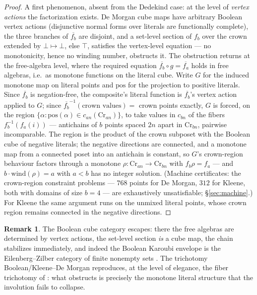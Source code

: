 \documentclass[11pt]{amsart}
\theoremstyle{definition}
\newtheorem{rem}[thm]{Remark}
\newcommand{\Crown}{\mathrm{Cr}}
\begin{document}
\begin{proof}
  A first phenomenon, absent from the Dedekind case: at the level
  of \emph{vertex actions} the factorization exists.  De Morgan
  cube maps have arbitrary Boolean vertex actions (disjunctive
  normal forms over literals are functionally complete), the three
  branches of $\overline{f_b}$ are disjoint, and a set-level
  section of $f_b$ over the crown extended by
  $\bot \mapsto \bot$, else $\top$, satisfies the vertex-level
  equation --- no monotonicity, hence no winding number, obstructs
  it.  The obstruction returns at the free-algebra level, where
  the required equation
  $\overline{f_b} \circ g = \overline{f_a}$ holds in
  free algebras, i.e.\ as monotone functions on the literal cube.
  Write $G$ for the induced monotone map on literal points and
  $\mathrm{pos}$ for the projection to positive literals.  Since
  $\overline{f_b}$ is negation-free, the composite's literal
  function is $\overline{f_b}$'s vertex action applied to $G$;
  since $\overline{f_b}^{-1}(\text{crown values}) = $ crown points
  exactly, $G$ is forced, on the region
  $\{\alpha : \mathrm{pos}(\alpha) \in c_{an}(\Crown_{an})\}$, to
  take values in $c_{bn}$ of the fibers
  $f_b^{-1}(f_a(i))$ --- antichains of $b$ points spaced $2n$
  apart in $\Crown_{bn}$, pairwise incomparable.  The region is
  the product of the crown subposet with the Boolean cube of
  negative literals; the negative directions are connected, and a
  monotone map from a connected poset into an antichain is
  constant, so $G$'s crown-region behaviour factors through a
  monotone $\rho : \Crown_{an} \to \Crown_{bn}$ with
  $f_b \rho = f_a$ --- and
  $b \cdot \mathrm{wind}(\rho) = a$ with $a < b$ has no integer
  solution.  (Machine certificates: the crown-region constraint
  problems --- $768$ points for De Morgan, $312$ for Kleene, both
  with domains of size $b = 4$ --- are exhaustively unsatisfiable;
  \S\ref{sec:machine}.)  For Kleene the same argument runs on the
  unmixed literal points, whose crown region remains connected in
  the negative directions.
\end{proof}

\begin{rem}
  The Boolean cube category escapes: there the free algebras are
  determined by vertex actions, the set-level section \emph{is} a
  cube map, the chain stabilizes immediately, and indeed the
  Boolean Karoubi envelope is the Eilenberg--Zilber category of
  finite nonempty sets \cite{Campion}.  The trichotomy
  Boolean/Kleene--De Morgan reproduces, at the level of elegance,
  the fiber trichotomy of \cite{Kleene}: what obstructs is
  precisely the monotone literal structure that the involution
  fails to collapse.
\end{rem}
\end{document}
